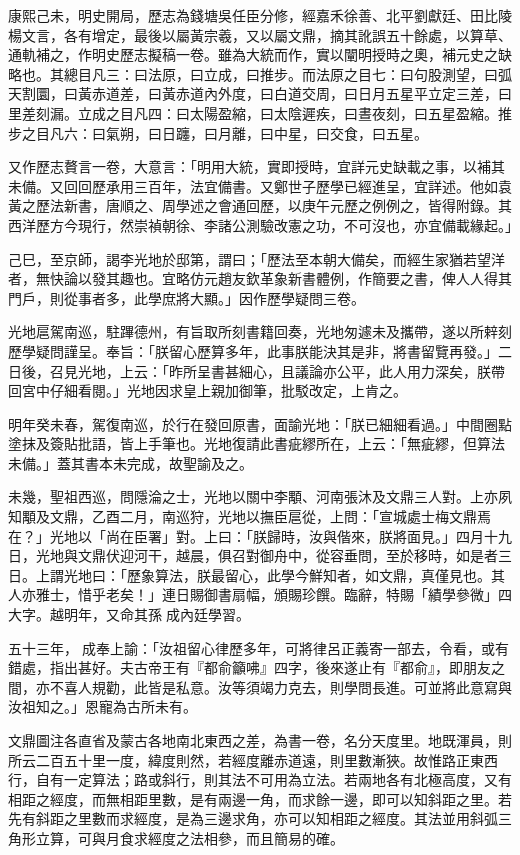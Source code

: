 \begin{pinyinscope}
康熙己未，明史開局，歷志為錢塘吳任臣分修，經嘉禾徐善、北平劉獻廷、田比陵楊文言，各有增定，最後以屬黃宗羲，又以屬文鼎，摘其訛誤五十餘處，以算草、通軌補之，作明史歷志擬稿一卷。雖為大統而作，實以闡明授時之奧，補元史之缺略也。其總目凡三：曰法原，曰立成，曰推步。而法原之目七：曰句股測望，曰弧天割圜，曰黃赤道差，曰黃赤道內外度，曰白道交周，曰日月五星平立定三差，曰里差刻漏。立成之目凡四：曰太陽盈縮，曰太陰遲疾，曰晝夜刻，曰五星盈縮。推步之目凡六：曰氣朔，曰日躔，曰月離，曰中星，曰交食，曰五星。

又作歷志贅言一卷，大意言：「明用大統，實即授時，宜詳元史缺載之事，以補其未備。又回回歷承用三百年，法宜備書。又鄭世子歷學已經進呈，宜詳述。他如袁黃之歷法新書，唐順之、周學述之會通回歷，以庚午元歷之例例之，皆得附錄。其西洋歷方今現行，然崇禎朝徐、李諸公測驗改憲之功，不可沒也，亦宜備載緣起。」

己巳，至京師，謁李光地於邸第，謂曰；「歷法至本朝大備矣，而經生家猶若望洋者，無快論以發其趣也。宜略仿元趙友欽革象新書體例，作簡要之書，俾人人得其門戶，則從事者多，此學庶將大顯。」因作歷學疑問三卷。

光地扈駕南巡，駐蹕德州，有旨取所刻書籍回奏，光地匆遽未及攜帶，遂以所辢刻歷學疑問謹呈。奉旨：「朕留心歷算多年，此事朕能決其是非，將書留覽再發。」二日後，召見光地，上云：「昨所呈書甚細心，且議論亦公平，此人用力深矣，朕帶回宮中仔細看閱。」光地因求皇上親加御筆，批駁改定，上肯之。

明年癸未春，駕復南巡，於行在發回原書，面諭光地：「朕已細細看過。」中間圈點塗抹及簽貼批語，皆上手筆也。光地復請此書疵繆所在，上云：「無疵繆，但算法未備。」蓋其書本未完成，故聖諭及之。

未幾，聖祖西巡，問隱淪之士，光地以關中李顒、河南張沐及文鼎三人對。上亦夙知顒及文鼎，乙酉二月，南巡狩，光地以撫臣扈從，上問：「宣城處士梅文鼎焉在？」光地以「尚在臣署」對。上曰：「朕歸時，汝與偕來，朕將面見。」四月十九日，光地與文鼎伏迎河干，越晨，俱召對御舟中，從容垂問，至於移時，如是者三日。上謂光地曰：「歷象算法，朕最留心，此學今鮮知者，如文鼎，真僅見也。其人亦雅士，惜乎老矣！」連日賜御書扇幅，頒賜珍饌。臨辭，特賜「績學參微」四大字。越明年，又命其孫成內廷學習。

五十三年，成奉上諭：「汝祖留心律歷多年，可將律呂正義寄一部去，令看，或有錯處，指出甚好。夫古帝王有『都俞籲咈』四字，後來遂止有『都俞』，即朋友之間，亦不喜人規勸，此皆是私意。汝等須竭力克去，則學問長進。可並將此意寫與汝祖知之。」恩寵為古所未有。

文鼎圖注各直省及蒙古各地南北東西之差，為書一卷，名分天度里。地既渾員，則所云二百五十里一度，緯度則然，若經度離赤道遠，則里數漸狹。故惟路正東西行，自有一定算法；路或斜行，則其法不可用為立法。若兩地各有北極高度，又有相距之經度，而無相距里數，是有兩邊一角，而求餘一邊，即可以知斜距之里。若先有斜距之里數而求經度，是為三邊求角，亦可以知相距之經度。其法並用斜弧三角形立算，可與月食求經度之法相參，而且簡易的確。


\end{pinyinscope}

